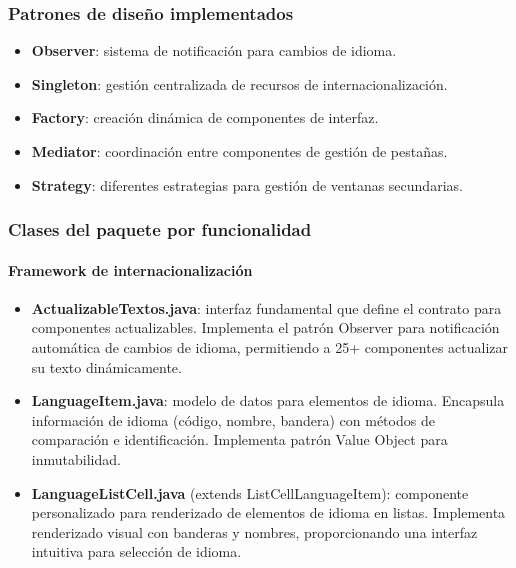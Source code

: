 \subsubsection{Patrones de diseño implementados}

\begin{itemize}
    \item \textbf{Observer}: sistema de notificación para cambios de idioma.
    \item \textbf{Singleton}: gestión centralizada de recursos de internacionalización.
    \item \textbf{Factory}: creación dinámica de componentes de interfaz.
    \item \textbf{Mediator}: coordinación entre componentes de gestión de pestañas.
    \item \textbf{Strategy}: diferentes estrategias para gestión de ventanas secundarias.
\end{itemize}

\subsubsection{Clases del paquete por funcionalidad}

\paragraph{Framework de internacionalización}
\begin{itemize}
    \item \textbf{ActualizableTextos.java}: interfaz fundamental que define el contrato para componentes actualizables. Implementa el patrón Observer para notificación automática de cambios de idioma, permitiendo a 25+ componentes actualizar su texto dinámicamente.

    \item \textbf{LanguageItem.java}: modelo de datos para elementos de idioma. Encapsula información de idioma (código, nombre, bandera) con métodos de comparación e identificación. Implementa patrón Value Object para inmutabilidad.

    \item \textbf{LanguageListCell.java} (extends ListCell\<LanguageItem\>): componente personalizado para renderizado de elementos de idioma en listas. Implementa renderizado visual con banderas y nombres, proporcionando una interfaz intuitiva para selección de idioma.
\end{itemize}

